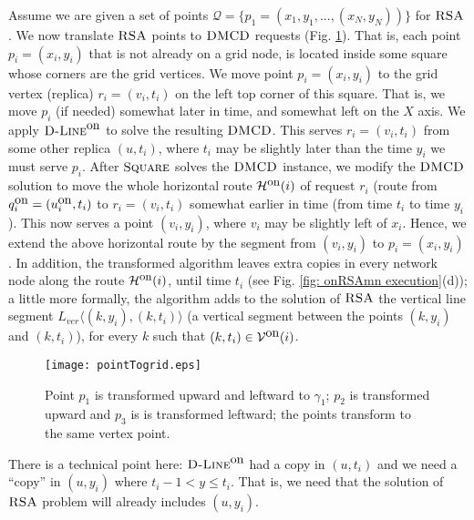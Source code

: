 \documentclass[11pt]{article}
\newcommand{\DMCD}{\mbox{\sc DMCD}}
\newcommand{\RSA}{\mbox{\sc RSA}}
\newcommand{\calV}{\mathcal{V}}
\newcommand{\calH}{\mathcal{H}}
\newcommand{\calQ}{\mathcal{Q}}
\newcommand{\Von}[0]{\calV^{\mbox{\upshape on}}}
\newcommand{\Square}[0]{\mbox{\sc Square}}
\newcommand{\linev}[1]{L_{ver}\langle #1\rangle}
\newcommand{\qon}{q^{\mbox{\upshape on}}}
\newcommand{\uon}{u^{\mbox{\upshape on}}}
\newcommand{\Dlineon}[0]{\mbox{{\sc D-Line}}^{\mbox{\upshape on}}}
\newcommand{\DPHon}[0]{\calH^{\mbox{\upshape\small on}}}
\begin{document}
Assume we are given a set of points $\calQ=\{p_1=(x_1,y_1,...,(x_N,y_N))\}$ for $\RSA$.
We now translate $\RSA$ points to $\DMCD$ requests (Fig. \ref{fig: pointsTogrid}).
That is, each point $p_i=(x_i,y_i)$ that is not already on a grid node, is located inside some square whose corners are the grid vertices.
We move point $p_i=(x_i,y_i)$ to the grid vertex (replica) $r_i=(v_i,t_i)$ on the left top corner of this square.
That is, we move $p_i$ (if needed) somewhat later in time, and somewhat left on the $X$ axis.
We apply $\Dlineon$ to solve the resulting $\DMCD$.
This serves $r_i=(v_i,t_i)$ from some other replica $(u,t_i)$, where $t_i$ may be slightly later than the time $y_i$ we must serve $p_i$.
After $\Square$ solves the $\DMCD$ instance, we modify the $\DMCD$ solution to move the whole horizontal route
$\DPHon(i)$ of request $r_i$
(route from $\qon_i=(\uon_i,t_i)$ to $r_i=(v_i,t_i)$
somewhat earlier in time (from time $t_i$ to time $y_i$).
This now serves a point $(v_i,y_i)$, where $v_i$ may be slightly left of $x_i$.
Hence,
we extend the above horizontal route
by the segment from $(v_i,y_i)$ to $p_i=(x_i,y_i)$.
In addition,
the transformed algorithm leaves extra copies in every network node along the route $\DPHon(i)$, until time $t_i$ (see Fig. \ref{fig: onRSAmn execution}(d));
a little more formally, the algorithm adds to the solution of $\RSA$ the
vertical line segment
$\linev{(k, {y_i}),(k,t_i)}$
(a vertical segment between the points $(k, {y_i})$ and $(k,t_i)$),
for every $k$ such that $(k,t_i)\in\Von(i)$.







\def\FigpointTogrid{
\begin{figure}[ht!]
\begin{center}
\texttt{[image: pointTogrid.eps]}
\end{center}
\caption{\sf Point $p_1$ is transformed upward and leftward to $\gamma_1$; $p_2$ is transformed upward and $p_3$ is is transformed leftward;  the points transform to the same vertex point.
\label{fig: pointsTogrid}}
\end{figure}
} \FigpointTogrid

There is a technical point here:
$\Dlineon$ had a copy in $(u,t_i)$ and we need a ``copy''  in $(u,y_i)$ where $t_i-1 < y \leq t_i$.
That is, we need that the solution of $\RSA$ problem will already includes $(u,y_i)$.
\end{document}
